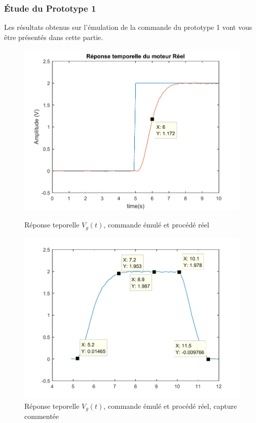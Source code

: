 		\subsubsection{Étude du Prototype 1}		
		Les résultats obtenus sur l'émulation de la commande du prototype 1 vont vous être présentés dans cette partie.
\begin{figure}[!ht]
\begin{minipage}{.5\textwidth}
\includegraphics[width = \textwidth]{./IV/images/repMoteurReel_proto1.pdf}
		\caption{Réponse teporelle $V_g(t)$, commande émulé et procédé réel\label{fig:rep_MoteurReel_proto1}}		
\end{minipage}
\begin{minipage}{.5\textwidth}
\includegraphics[width = \textwidth]{./IV/images/rep_MoteurReel_proto1.pdf}
		\caption{Réponse teporelle $V_g(t)$, commande émulé et procédé réel, capture commentée \label{fig:rep_MoteurReel_proto1zoom}}
\end{minipage}
\end{figure}				
